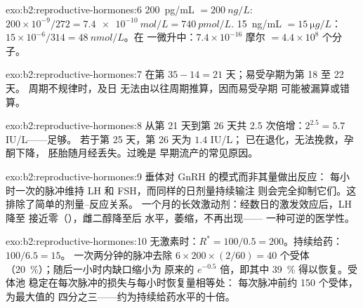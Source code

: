 \begin{solution}{exo:b2:reproductive-hormones:6}
\qty{200}{pg/mL} $= \qty{200}{ng/L}$: $200\times 10^{-9}/272 =
\qty{7.4e-10}{mol/L} = \qty{740}{pmol/L}$. \qty{15}{ng/mL} $=
\qty{15}{\micro g/L}$：$15\times 10^{-6}/314 = \qty{48}{nmol/L}$。在
一微升中：$7.4\times 10^{-16}$ 摩尔 $= 4.4\times 10^{8}$
个分子。
\end{solution}

\begin{solution}{exo:b2:reproductive-hormones:7}
在第 $35 - 14 = 21$ 天；易受孕期为第 18 至 22 天。
周期不规律时，及日
无法由以往周期推算，因而易受孕期
可能被漏算或错算。
\end{solution}

\begin{solution}{exo:b2:reproductive-hormones:8}
从第 21 天到第 26 天共 2.5 次倍增：$2^{2.5} = 5.7$ IU/L——足够。
若于第 25 天，第 26 天为 $1.4$ IU/L；
已在退化，无法挽救，孕酮下降，
胚胎随月经丢失。过晚是
早期流产的常见原因。
\end{solution}

\begin{solution}{exo:b2:reproductive-hormones:9}
垂体对 GnRH 的模式而非其量做出反应：
每小时一次的脉冲维持 LH 和 FSH，而同样的日剂量持续输注
则会完全抑制它们。这排除了简单的剂量–反应关系。
一个月的长效激动剂：经数日的激发效应后，LH 降至
接近零（），雌二醇降至后
水平，萎缩，不再出现——
一种可逆的医学性。
\end{solution}

\begin{solution}{exo:b2:reproductive-hormones:10}
无激素时：$R^* = 100/0.5 = 200$。持续给药：$100/6.5 = 15$。
一次两分钟的脉冲去除 $6\times 200\times(2/60) = 40$ 个受体
（\qty{20}{\%}）；随后一小时内缺口缩小为
原来的 $e^{-0.5}$ 倍，即其中 \qty{39}{\%} 得以恢复。受体池
稳定在每次脉冲的损失与每小时恢复量相等处：
每次脉冲前约 150 个受体，为最大值的
四分之三——约为持续给药水平的十倍。
\end{solution}

